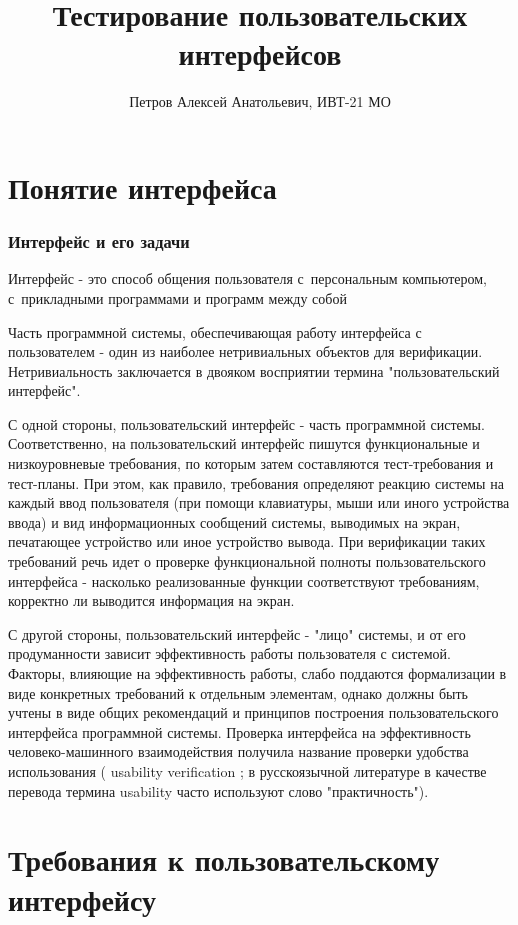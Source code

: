 \documentclass{../industrial-development}
\title{Тестирование пользовательских интерфейсов}
\author{Петров Алексей Анатольевич, ИВТ-21 МО}
\date{}
\begin{document}
\begin{frame}
  \titlepage
\end{frame}

\section{Понятие интерфейса}

\begin{frame} \frametitle{Интерфейс и его задачи}
 Интерфейс - это способ общения пользователя с~персональным компьютером, с~прикладными программами и программ между собой
\end{frame}

\lecturenotes

Часть программной системы, обеспечивающая работу интерфейса с пользователем - один из наиболее нетривиальных объектов для верификации. Нетривиальность заключается в двояком восприятии термина "пользовательский интерфейс".

С одной стороны, пользовательский интерфейс - часть программной системы. Соответственно, на пользовательский интерфейс пишутся функциональные и низкоуровневые требования, по которым затем составляются тест-требования и тест-планы. При этом, как правило, требования определяют реакцию системы на каждый ввод пользователя (при помощи клавиатуры, мыши или иного устройства ввода) и вид информационных сообщений системы, выводимых на экран, печатающее устройство или иное устройство вывода. При верификации таких требований речь идет о проверке функциональной полноты пользовательского интерфейса - насколько реализованные функции соответствуют требованиям, корректно ли выводится информация на экран.

С другой стороны, пользовательский интерфейс - "лицо" системы, и от его продуманности зависит эффективность работы пользователя с системой. Факторы, влияющие на эффективность работы, слабо поддаются формализации в виде конкретных требований к отдельным элементам, однако должны быть учтены в виде общих рекомендаций и принципов построения пользовательского интерфейса программной системы. Проверка интерфейса на эффективность человеко-машинного взаимодействия получила название проверки удобства использования ( usability verification ; в русскоязычной литературе в качестве перевода термина usability часто используют слово "практичность").


\section{Требования к пользовательскому интерфейсу}
\end{document}
